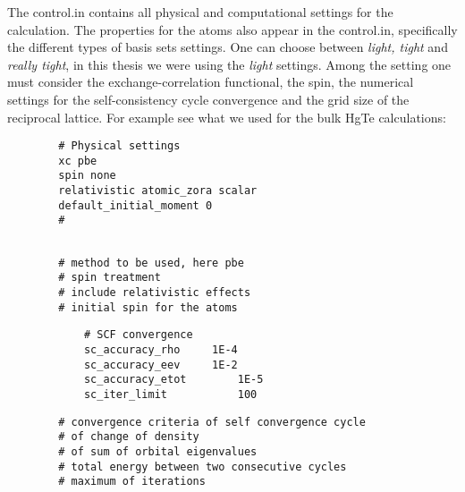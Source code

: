 	The control.in contains all physical and computational settings for the calculation. The properties for the atoms also appear in the control.in, specifically the different types of basis sets settings.
	One can choose between \textit{light, tight} and \textit{really tight}, in this thesis we were using the \textit{light} settings.
	Among the setting one must consider the exchange-correlation functional, the spin, the numerical settings for the self-consistency cycle convergence and the grid size of the reciprocal lattice. For example see what we used for the bulk HgTe calculations:
	\\
	\begin{minipage}[c]{0.45\linewidth}	\vspace{15pt}
		\begin{verbatim}
		# Physical settings
		xc pbe
		spin none
		relativistic atomic_zora scalar
		default_initial_moment 0
		#
		\end{verbatim} 
	\end{minipage}
	\begin{minipage}[c]{0.55\linewidth} \vspace{11pt}
		\begin{verbatim}
		
		# method to be used, here pbe
		# spin treatment
		# include relativistic effects
		# initial spin for the atoms
		\end{verbatim}
	\end{minipage} 
	\begin{minipage}[c]{0.3\linewidth} \vspace{0.2cm}
		\begin{verbatim} 
			# SCF convergence
			sc_accuracy_rho		1E-4
			sc_accuracy_eev		1E-2
			sc_accuracy_etot		1E-5
			sc_iter_limit			100	
		\end{verbatim}
	\end{minipage} 
	\hfill
	\begin{minipage}[c]{0.7\linewidth} \vspace{0.15cm}
		\begin{verbatim}
		# convergence criteria of self convergence cycle
		# of change of density
		# of sum of orbital eigenvalues
		# total energy between two consecutive cycles
		# maximum of iterations
		\end{verbatim}
	\end{minipage} 

